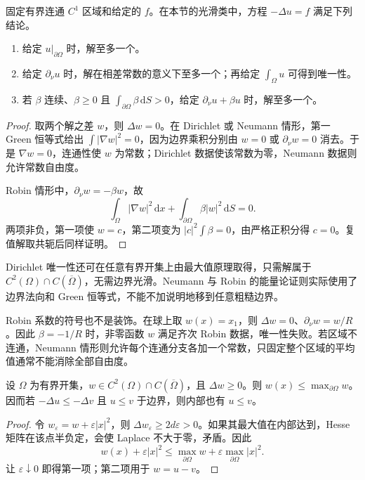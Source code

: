 \begin{theorem}[三类边界条件下的唯一性]\label{b2:thm:13-boundary-uniqueness}
固定有界连通 \(C^1\) 区域和给定的 \(f\)。在本节的光滑类中，方程 \(-\Delta u=f\) 满足下列结论。
\begin{enumerate}
\item\label{b2:item:13-unique-dirichlet}给定 \(u|_{\partial\Omega}\) 时，解至多一个。
\item\label{b2:item:13-unique-neumann}给定 \(\partial_\nu u\) 时，解在相差常数的意义下至多一个；再给定 \(\int_\Omega u\) 可得到唯一性。
\item\label{b2:item:13-unique-robin}若 \(\beta\) 连续、\(\beta\geq0\) 且 \(\int_{\partial\Omega}\beta\,\mathrm{d}S>0\)，给定 \(\partial_\nu u+\beta u\) 时，解至多一个。
\end{enumerate}
\end{theorem}
\begin{proof}
取两个解之差 \(w\)，则 \(\Delta w=0\)。在 Dirichlet 或 Neumann 情形，第一 Green 恒等式给出 \(\int|\nabla w|^2=0\)，因为边界乘积分别由 \(w=0\) 或 \(\partial_\nu w=0\) 消去。于是 \(\nabla w=0\)，连通性使 \(w\) 为常数；Dirichlet 数据使该常数为零，Neumann 数据则允许常数自由度。

Robin 情形中，\(\partial_\nu w=-\beta w\)，故
\[
 \int_\Omega|\nabla w|^2\,\mathrm{d}x
 +\int_{\partial\Omega}\beta|w|^2\,\mathrm{d}S=0.
\]
两项非负，第一项使 \(w=c\)，第二项变为 \(|c|^2\int\beta=0\)，由严格正积分得 \(c=0\)。复值解取共轭后同样证明。
\end{proof}

Dirichlet 唯一性还可在任意有界开集上由最大值原理取得，只需解属于 \(C^2(\Omega)\cap C(\overline\Omega)\)，无需边界光滑。Neumann 与 Robin 的能量论证则实际使用了边界法向和 Green 恒等式，不能不加说明地移到任意粗糙边界。

\ProseParagraphBreak

Robin 系数的符号也不是装饰。在球上取 \(w(x)=x_1\)，则 \(\Delta w=0\)、\(\partial_\nu w=w/R\)。因此 \(\beta=-1/R\) 时，非零函数 \(w\) 满足齐次 Robin 数据，唯一性失败。若区域不连通，Neumann 情形则允许每个连通分支各加一个常数，只固定整个区域的平均值通常不能消除全部自由度。

\begin{proposition}\label{b2:prop:13-subharmonic-comparison}
设 \(\Omega\) 为有界开集，\(w\in C^2(\Omega)\cap C(\overline\Omega)\)，且 \(\Delta w\geq0\)。则 \(w(x)\leq\max_{\partial\Omega}w\)。因而若 \(-\Delta u\leq-\Delta v\) 且 \(u\leq v\) 于边界，则内部也有 \(u\leq v\)。
\end{proposition}
\begin{proof}
令 \(w_\varepsilon=w+\varepsilon|x|^2\)，则 \(\Delta w_\varepsilon\geq2d\varepsilon>0\)。如果其最大值在内部达到，Hesse 矩阵在该点半负定，会使 Laplace 不大于零，矛盾。因此
\[
 w(x)+\varepsilon|x|^2
 \leq\max_{\partial\Omega}w+\varepsilon\max_{\partial\Omega}|x|^2.
\]
让 \(\varepsilon\downarrow0\) 即得第一项；第二项用于 \(w=u-v\)。
\end{proof}

